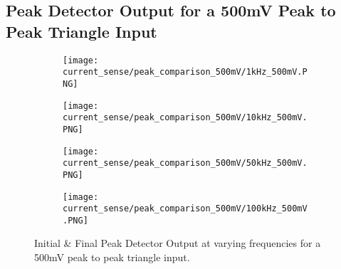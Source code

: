 \subsection{Peak Detector Output for a 500mV Peak to Peak Triangle Input}
\begin{figure}[H]
    
    \centering
    \begin{subfigure}{0.45\textwidth}
        \texttt{[image: current\_sense/peak\_comparison\_500mV/1kHz\_500mV.PNG]}
    \end{subfigure}
    \begin{subfigure}{0.45\textwidth}
        \texttt{[image: current\_sense/peak\_comparison\_500mV/10kHz\_500mV.PNG]}
    \end{subfigure}
    \begin{subfigure}{0.45\textwidth}
        \texttt{[image: current\_sense/peak\_comparison\_500mV/50kHz\_500mV.PNG]}
    \end{subfigure}
    \begin{subfigure}{0.45\textwidth}
        \texttt{[image: current\_sense/peak\_comparison\_500mV/100kHz\_500mV.PNG]}
    \end{subfigure}
    \caption{Initial \& Final Peak Detector Output at varying frequencies for a 500mV peak to peak triangle input.}
\end{figure}


